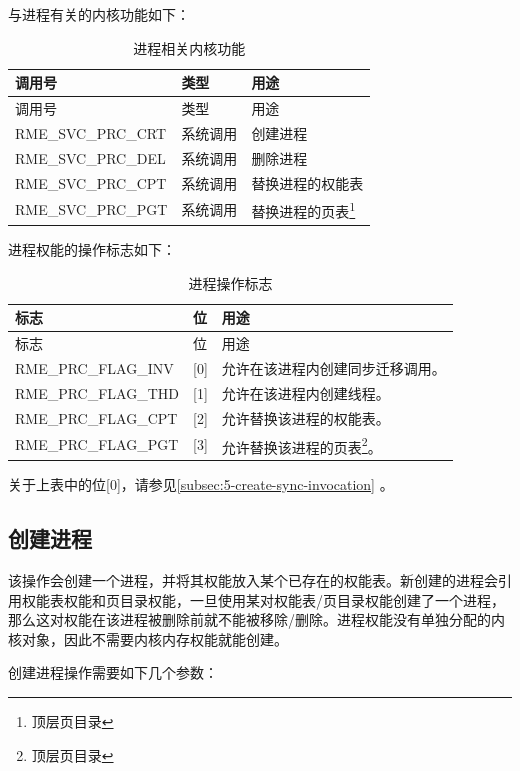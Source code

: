 与进程有关的内核功能如下：

\begin{xltabular}{\textwidth}{@{}>{\hsize\raggedright\arraybackslash}X>{\hsize\raggedright\arraybackslash}X>{\hsize\raggedright\arraybackslash}X@{}}
\caption{进程相关内核功能}\label{tab:4-8-process-related-kernel-functions}\\
\toprule
调用号 & 类型 & 用途\tabularnewline
\endfirsthead
\toprule
调用号 & 类型 & 用途\tabularnewline
\midrule
\endhead
\bottomrule
\endlastfoot
RME\_SVC\_PRC\_CRT & 系统调用 & 创建进程\tabularnewline
RME\_SVC\_PRC\_DEL & 系统调用 & 删除进程\tabularnewline
RME\_SVC\_PRC\_CPT & 系统调用 & 替换进程的权能表\tabularnewline
RME\_SVC\_PRC\_PGT & 系统调用 &
替换进程的页表\footnote{顶层页目录}\tabularnewline
\end{xltabular}

进程权能的操作标志如下：

\begin{xltabular}{\textwidth}{@{}>{\hsize\raggedright\arraybackslash}X>{\hsize\raggedright\arraybackslash}X>{\hsize\raggedright\arraybackslash}X@{}}
\caption{进程操作标志}\label{tab:4-9-process-operation-flags}\\
\toprule
标志 & 位 & 用途\tabularnewline
\endfirsthead
\toprule
标志 & 位 & 用途\tabularnewline
\midrule
\endhead
\bottomrule
\endlastfoot
RME\_PRC\_FLAG\_INV & {[}0{]} &
允许在该进程内创建同步迁移调用。\tabularnewline
RME\_PRC\_FLAG\_THD & {[}1{]} & 允许在该进程内创建线程。\tabularnewline
RME\_PRC\_FLAG\_CPT & {[}2{]} & 允许替换该进程的权能表。\tabularnewline
RME\_PRC\_FLAG\_PGT & {[}3{]} &
允许替换该进程的页表\footnote{顶层页目录}。\tabularnewline
\end{xltabular}

关于上表中的位{[}0{]}，请参见\ref{subsec:5-create-sync-invocation}
。

\subsection{创建进程}\label{subsec:4-create-a-process}

该操作会创建一个进程，并将其权能放入某个已存在的权能表。新创建的进程会引用权能表权能和页目录权能，一旦使用某对权能表/页目录权能创建了一个进程，那么这对权能在该进程被删除前就不能被移除/删除。进程权能没有单独分配的内核对象，因此不需要内核内存权能就能创建。

创建进程操作需要如下几个参数：

